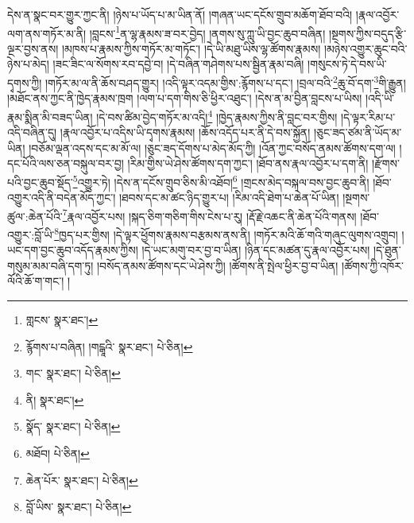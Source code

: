 དེས་ན་སྣང་བར་གྱུར་ཀྱང་ནི། །ཉེས་པ་ཡོད་པ་མ་ཡིན་ནོ། །གཞན་ཡང་དངོས་གྲུབ་མཆོག་ཐོབ་བའི། །རྣལ་འབྱོར་ལག་ནས་གཏོར་མ་ནི། །བླངས་\footnote{གླངས་  སྣར་ཐང་། }ན་ལྷ་རྣམས་ཟ་བར་བྱེད། །ནགས་སུ་ཀླུ་ཡི་བྱང་ཆུབ་བཞིན། །སྔགས་ཀྱིས་བདུད་རྩི་ལྔར་བྱས་ནས། །མཁས་པ་རྣམས་ཀྱིས་གཏོར་མ་གཏོང་། །དེ་ཡི་མཐུ་ཡིས་ལྷ་ཚོགས་རྣམས། །མཉེས་འགྱུར་ཆུང་བའི་ཉེས་པ་མེད། །ཟང་ཟིང་ལ་སོགས་རབ་དབྱེ་བ། །དེ་བཞིན་གཤེགས་པས་སྦྱིན་རྣམ་བཞི། །གསུངས་ཏེ་དེ་བས་ཡི་དྭགས་ཀྱི། །གཏོར་མ་ལ་ནི་ཆོས་བཤད་གྱུར། །འདི་ལྟར་འདམ་གྱིས་:རྙོགས་པ་དང་། །བྲལ་བའི་\footnote{རྙོགས་པ་བཞིན། །གངྒཱའི་  སྣར་ཐང་།  པེ་ཅིན། }ཆུ་བོ་དག་\footnote{གང་  སྣར་ཐང་།  པེ་ཅིན། }གི་རྒྱུན། །མཐོང་ནས་ཀྱང་ནི་ཁྱེད་རྣམས་ཁྲག །ལག་པ་དག་གིས་ཅི་ཕྱིར་འཐུང་། །དེས་ན་མ་བྱིན་བླངས་པ་ཡིས། །འདི་ཡི་རྣམ་སྨིན་མི་བཟད་ཡིན། །དེ་བས་ཚིམ་བྱེད་གཏོར་མ་འདི།\footnote{ནི།  སྣར་ཐང་། } །ཁྱེད་རྣམས་ཀྱིས་ནི་བླང་བར་གྱིས། །དེ་ལྟར་རིམ་པ་འདི་བཞིན་དུ། །རྣལ་འབྱོར་པ་འདིས་ཡི་དྭགས་རྣམས། །ཆོས་འདོད་པར་ནི་དེ་བས་སྐྱོན། །ཅུང་ཟད་ཙམ་ནི་ཡོད་མ་ཡིན། །བཅོམ་ལྡན་འདས་དང་མ་མོ་ལ། །ཅུང་ཟད་དོགས་པ་མེད་མོད་ཀྱི། །འོན་ཀྱང་བསོད་ནམས་ཚོགས་དག་ལ། །དང་པོའི་ལས་ཅན་བསྐུལ་བར་བྱ། །རིམ་གྱིས་ཡེ་ཤེས་ཚོགས་དག་ཀྱང་། །ཐོབ་ནས་རྣལ་འབྱོར་པ་དག་ནི། །རྫོགས་པའི་བྱང་ཆུབ་སྡོད་\footnote{སྣོད་  སྣར་ཐང་།  པེ་ཅིན། }འགྱུར་ཏེ། །དེས་ན་དངོས་གྲུབ་ཅིས་མི་འཐོབ།\footnote{མཐོབ།  པེ་ཅིན། } །གྲངས་མེད་བསྐལ་བས་བྱང་ཆུབ་ནི། །ཐོབ་འགྱུར་འདི་ནི་བདེན་མོད་ཀྱང་། །ཐབས་དང་མ་ཚང་ཉིད་གྱུར་པ། །རིམ་འདི་ཐེག་པ་ཆེན་པོ་ཡིན། །སྔགས་ཚུལ་:ཆེན་པོའི་\footnote{ཆེན་པོར་  སྣར་ཐང་།  པེ་ཅིན། }རྣལ་འབྱོར་པས། །སྐད་ཅིག་གཅིག་གིས་ངེས་པ་རུ། །རྡོ་རྗེ་འཆང་ནི་ཆེན་པོའི་གནས། །ཐོབ་འགྱུར་:བློ་ཡི་\footnote{བློ་ཡིས་  སྣར་ཐང་།  པེ་ཅིན། }ཁྱད་པར་གྱིས། །དེ་ལྟར་ཕྱོགས་རྣམས་བརྩམས་ནས་ནི། །གཏོར་མའི་ཆོ་གའི་གཞུང་ལུགས་འགྲུབ། །ཡང་དག་བྱང་ཆུབ་འདོད་རྣམས་ཀྱིས། །དེ་ཡང་མགུ་བར་བྱ་བ་ཡིན། །ཉིན་དང་མཚན་དུ་རྣལ་འབྱོར་པས། །དེ་ཐུན་གསུམ་མམ་བཞི་དག་ཏུ། །བསོད་ནམས་ཚོགས་དང་ཡེ་ཤེས་ཀྱི། །ཚོགས་ནི་སྤེལ་ཕྱིར་བྱ་བ་ཡིན། །ཚོགས་ཀྱི་འཁོར་ལོའི་ཆོ་ག་གང་། །
